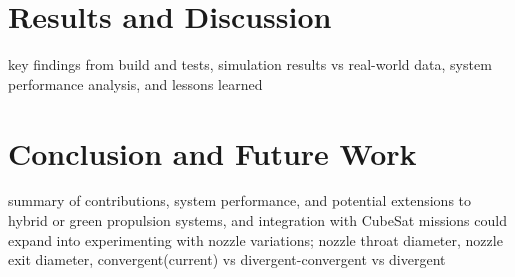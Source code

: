 \documentclass{new-aiaa}
\begin{document}
\section{Results and Discussion}
key findings from build and tests, simulation results vs real-world data, system performance analysis, and lessons learned

\section{Conclusion and Future Work}
summary of contributions, system performance, and potential extensions to hybrid or green propulsion systems, and integration with CubeSat missions
could expand into experimenting with nozzle variations; nozzle throat diameter, nozzle exit diameter, convergent(current) vs divergent-convergent vs divergent



\end{document}
